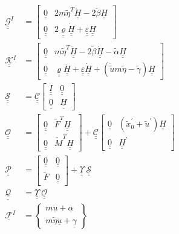 \documentclass{aiaa-tc}
\newcommand{\tens}[1]{\underline{\underline{#1}}}
\renewcommand{\vec}[1]{\underline{#1}}
\begin{document}
\begin{align}
        \label{mathcalG}
        \tens{\mathcal{G}}^I &= \begin{bmatrix}
        \tens{0} & 2m\tilde{\eta}^T \dot{\tens{H}}-2 \tilde{\beta} \tens{H}  \\
        \tens{0} & 2 \tens{\varrho} \tens{\dot{H}} + \tens{\varepsilon} \tens{H}
        \end{bmatrix} \\
        \label{mathcalK}
        \tens{\mathcal{K}}^I &= \begin{bmatrix}
        \tens{0} & m \tilde{\eta}^T \ddot{\tens{H}} - 2 \tilde{\beta} \tens{\dot{H}} - \tilde{\alpha} \tens{H} \\
        \tens{0} & \tens{\varrho} \ddot{\tens{H}} + \tens{\varepsilon} \dot{\tens{H}} + (\ddot{\tilde{u}} m \tilde{\eta}-\tilde{\gamma}) \tens{H}
        \end{bmatrix}\\
	\label{mathcalS}
	\mathcal{\tens{S}} &= \tens{\mathcal{C}} \begin{bmatrix}
	\underline{\underline{I}} & \underline{\underline{0}} \\
	\underline{\underline{0}} & \tens{H}
	\end{bmatrix} \\
	\label{mathcalO}
	\mathcal{\tens{O}} &= \begin{bmatrix}
	\underline{\underline{0}} & \tilde{F}^T \tens{H} \\
	\underline{\underline{0}}& \tilde{M}^T \tens{H}
	\end{bmatrix} + \tens{\mathcal{C}} \begin{bmatrix}
	\underline{\underline{0}} & (\tilde{x}^\prime_0 + \tilde{u}^\prime) \tens{H} \\
	\underline{\underline{0}} & \tens{H}^\prime
	\end{bmatrix} \\
	\label{mathcalP}
	\mathcal{\tens{P}} &= \begin{bmatrix}
	\underline{\underline{0}} & \underline{\underline{0}} \\
	\tilde{F} & \underline{\underline{0}}
	\end{bmatrix} + \tens{\Upsilon}~ \mathcal{\tens{S}} \\
	\label{mathcalQ}
	\mathcal{\tens{Q}} &= \tens{\Upsilon}~ \mathcal{\tens{O}} \\
	\label{mathcalF}
	\vec{\mathcal{F}}^I &= \begin{Bmatrix}
	m \ddot{\vec{u}} + \vec{\alpha} \\
	m \tilde{\eta} \ddot{\vec{u}} + \vec{\gamma}
	\end{Bmatrix}
\end{align}
\end{document}
